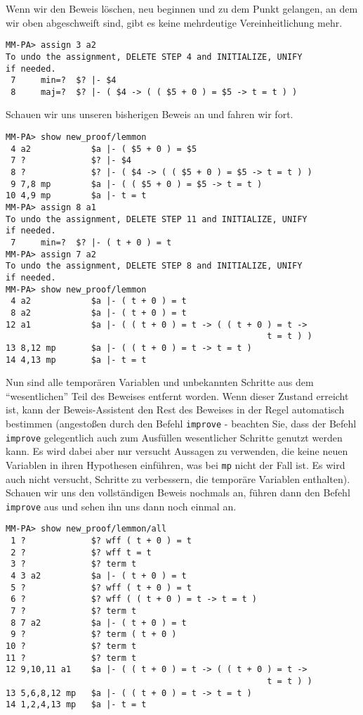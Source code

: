 Wenn wir den Beweis löschen, neu beginnen und zu dem Punkt gelangen, an dem wir oben abgeschweift sind, gibt es keine mehrdeutige Vereinheitlichung mehr.

\begin{verbatim}
MM-PA> assign 3 a2
To undo the assignment, DELETE STEP 4 and INITIALIZE, UNIFY
if needed.
 7     min=?  $? |- $4
 8     maj=?  $? |- ( $4 -> ( ( $5 + 0 ) = $5 -> t = t ) )
\end{verbatim}

Schauen wir uns unseren bisherigen Beweis an und fahren wir fort.

\begin{verbatim}
MM-PA> show new_proof/lemmon
 4 a2            $a |- ( $5 + 0 ) = $5
 7 ?             $? |- $4
 8 ?             $? |- ( $4 -> ( ( $5 + 0 ) = $5 -> t = t ) )
 9 7,8 mp        $a |- ( ( $5 + 0 ) = $5 -> t = t )
10 4,9 mp        $a |- t = t
MM-PA> assign 8 a1
To undo the assignment, DELETE STEP 11 and INITIALIZE, UNIFY
if needed.
 7     min=?  $? |- ( t + 0 ) = t
MM-PA> assign 7 a2
To undo the assignment, DELETE STEP 8 and INITIALIZE, UNIFY
if needed.
MM-PA> show new_proof/lemmon
 4 a2            $a |- ( t + 0 ) = t
 8 a2            $a |- ( t + 0 ) = t
12 a1            $a |- ( ( t + 0 ) = t -> ( ( t + 0 ) = t ->
                                                    t = t ) )
13 8,12 mp       $a |- ( ( t + 0 ) = t -> t = t )
14 4,13 mp       $a |- t = t
\end{verbatim}

Nun sind alle temporären Variablen und unbekannten Schritte aus dem "`wesentlichen"' Teil des Beweises entfernt worden.  Wenn dieser Zustand erreicht ist, kann der Beweis-Assistent den Rest des Beweises in der Regel automatisch bestimmen (angestoßen durch den Befehl \texttt{improve} - beachten Sie, dass der Befehl \texttt{improve} gelegentlich auch zum Ausfüllen wesentlicher Schritte genutzt werden kann. Es wird dabei aber nur versucht Aussagen zu verwenden, die keine neuen Variablen in ihren Hypothesen einführen, was bei \texttt{mp} nicht der Fall ist. Es wird auch nicht versucht, Schritte zu verbessern, die temporäre Variablen enthalten).  Schauen wir uns den vollständigen Beweis nochmals an, führen dann den Befehl \texttt{improve} aus und sehen ihn uns dann noch einmal an.

\begin{verbatim}
MM-PA> show new_proof/lemmon/all
 1 ?             $? wff ( t + 0 ) = t
 2 ?             $? wff t = t
 3 ?             $? term t
 4 3 a2          $a |- ( t + 0 ) = t
 5 ?             $? wff ( t + 0 ) = t
 6 ?             $? wff ( ( t + 0 ) = t -> t = t )
 7 ?             $? term t
 8 7 a2          $a |- ( t + 0 ) = t
 9 ?             $? term ( t + 0 )
10 ?             $? term t
11 ?             $? term t
12 9,10,11 a1    $a |- ( ( t + 0 ) = t -> ( ( t + 0 ) = t ->
                                                    t = t ) )
13 5,6,8,12 mp   $a |- ( ( t + 0 ) = t -> t = t )
14 1,2,4,13 mp   $a |- t = t
\end{verbatim}

